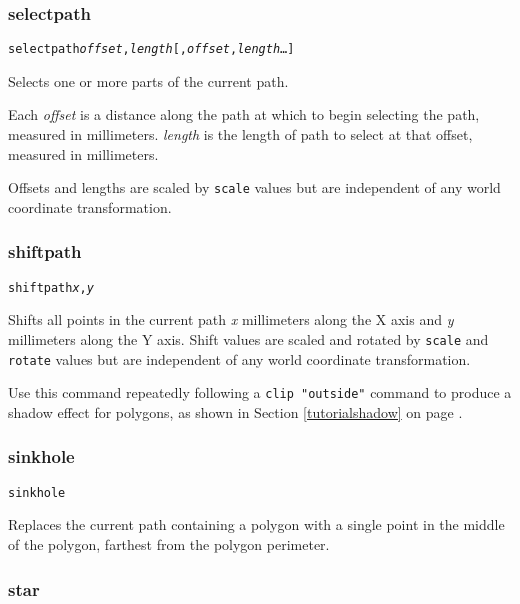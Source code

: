 \subsubsection{selectpath}

\begin{alltt}
selectpath \textit{offset}, \textit{length} [, \textit{offset}, \textit{length}  \dots ]
\end{alltt}

Selects one or more parts of the current path.

Each \textit{offset} is a distance along the path at which to begin selecting
the path, measured in millimeters.
\textit{length} is the length of path to select at that offset, measured
in millimeters.

Offsets and lengths are scaled by \texttt{scale} values but are independent of
any world coordinate transformation.

\subsubsection{shiftpath}

\begin{alltt}
shiftpath \textit{x}, \textit{y}
\end{alltt}

Shifts all points in the current path \textit{x} millimeters along the X axis
and \textit{y} millimeters along the Y axis.  Shift values are scaled and
rotated by \texttt{scale} and \texttt{rotate} values but are independent
of any world coordinate transformation.

Use this command
repeatedly following a \texttt{clip "outside"} command to produce a shadow
effect for polygons, as shown in 
Section \ref{tutorialshadow} on page \pageref{tutorialshadow}.

\subsubsection{sinkhole}

\begin{alltt}
sinkhole
\end{alltt}

Replaces the current path containing a polygon with a single point in the
middle of the polygon, farthest from the polygon perimeter.

\subsubsection{star}

